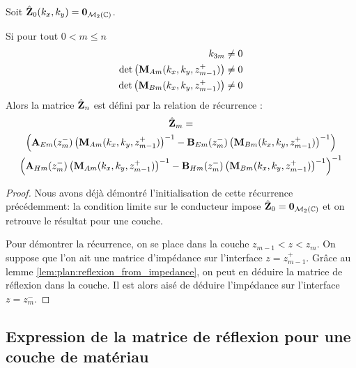         \begin{thm}
            \label{thm:imp:fourier:plan:multi_couche}
            Soit \(\hat {\mathbf{Z}}_0(k_x,k_y) = \mathbf{0}_{\mathcal{M}_2(\mathbb C)}\).

            Si pour tout \(0 < m \le n\)
            \begin{align}
                k_{3m} &\not = 0
                \\
                \det\left(\mathbf{M}_{Am}(k_x,k_y,z_{m-1}^+)\right) &\not = 0 
                \\
                \det\left(\mathbf{M}_{Bm}(k_x,k_y,z_{m-1}^+)\right) &\not = 0
            \end{align}
            Alors la matrice \(\hat {\mathbf{Z}}_n\) est défini par la relation de récurrence :
            \begin{multline*}
                \hat {\mathbf{Z}}_m = \\
                \left(\mathbf{A}_{Em}(z_{m}^-)\left(\mathbf{M}_{Am}(k_x,k_y,z_{m-1}^+)\right)^{-1} - \mathbf{B}_{Em}(z_{m}^-) \left(\mathbf{M}_{Bm}(k_x,k_y,z_{m-1}^+)\right)^{-1}\right)
                \\
                \left(\mathbf{A}_{Hm}(z_{m}^-)\left(\mathbf{M}_{Am}(k_x,k_y,z_{m-1}^+)\right)^{-1} - \mathbf{B}_{Hm}(z_{m}^-) \left(\mathbf{M}_{Bm}(k_x,k_y,z_{m-1}^+)\right)^{-1}\right)^{-1}
            \end{multline*}
        \end{thm}

        \begin{proof}
            Nous avons déjà démontré l'initialisation de cette récurrence précédemment: la condition limite sur le conducteur impose \(\hat {\mathbf{Z}}_0 = \mathbf{0}_{\mathcal{M}_2(\mathbb C)}\) et on retrouve le résultat pour une couche.

            Pour démontrer la récurrence, on se place dans la couche \(z_{m-1}<z<z_m\). On suppose que l'on ait une matrice d'impédance sur l'interface \(z= z_{m-1}^+\). Grâce au lemme \ref{lem:plan:reflexion_from_impedance}, on peut en déduire la matrice de réflexion dans la couche. Il est alors aisé de déduire l'impédance sur l'interface \(z=z_m^-\).
        \end{proof}



    \subsection{Expression de la matrice de réflexion pour une couche de matériau}

